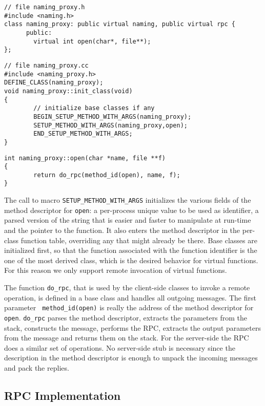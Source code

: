 {\small 
\begin{verbatim}
// file naming_proxy.h
#include <naming.h>
class naming_proxy: public virtual naming, public virtual rpc {
      public:
        virtual int open(char*, file**);
};
\end{verbatim}
}
{\small 
\begin{verbatim}
// file naming_proxy.cc
#include <naming_proxy.h>
DEFINE_CLASS(naming_proxy);
void naming_proxy::init_class(void)
{
        // initialize base classes if any
        BEGIN_SETUP_METHOD_WITH_ARGS(naming_proxy);
        SETUP_METHOD_WITH_ARGS(naming_proxy,open);
        END_SETUP_METHOD_WITH_ARGS;
}
\end{verbatim}
}
{\small 
\begin{verbatim}
int naming_proxy::open(char *name, file **f)
{
        return do_rpc(method_id(open), name, f);
}
\end{verbatim}
}

The call to macro {\tt SETUP\_METHOD\_WITH\_ARGS} initializes the
various fields of the method descriptor for {\tt open}: 
a per-process unique value to be used as identifier, a parsed version
of the string that is easier and faster to manipulate at run-time and the
pointer to the function. It also enters the method descriptor
in the per-class function table, overriding any that might already be there.
Base classes are initialized first, so that the function associated with the
function identifier is the one of the most derived class, which is the
desired behavior for virtual functions. For this reason we only
support remote invocation of virtual functions.

The function {\tt do\_rpc}, that is used by the client-side classes to
invoke a remote operation, is defined in a base class and
handles all outgoing messages. The first parameter {\tt
method\_id(open)} is really the address of the method descriptor
for {\tt open}. {\tt do\_rpc} parses the method descriptor, extracts
the parameters from the stack, constructs the message, performs the
RPC, extracts the output parameters from the message and returns them
on the stack. For the server-side the RPC does a similar set of
operations. No server-side stub is necessary since the description in
the method descriptor is enough to unpack the incoming messages and
pack the replies.

\subsection{RPC Implementation}

